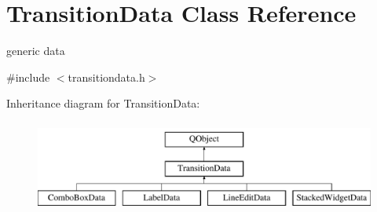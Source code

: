 \hypertarget{class_transition_data}{}\section{Transition\+Data Class Reference}
\label{class_transition_data}


generic data  




{\ttfamily \#include $<$transitiondata.\+h$>$}

Inheritance diagram for Transition\+Data\+:\begin{figure}[H]
\begin{center}
\leavevmode
\includegraphics[height=3.000000cm]{class_transition_data}
\end{center}
\end{figure}
